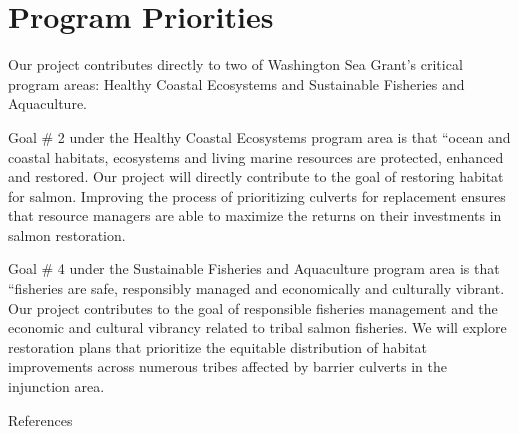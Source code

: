 \documentclass[12pt]{elsarticle}
\begin{document}
\section{Program Priorities} %

Our project contributes directly to two of Washington Sea Grant's critical program areas: Healthy Coastal Ecosystems and Sustainable Fisheries and Aquaculture. 

Goal \# 2 under the Healthy Coastal Ecosystems program area is that ``ocean and coastal habitats, ecosystems and living marine resources are protected, enhanced and restored. Our project will directly contribute to the goal of restoring habitat for salmon. Improving the process of prioritizing culverts for replacement ensures that resource managers are able to maximize the returns on their investments in salmon restoration.

Goal \# 4 under the Sustainable Fisheries and Aquaculture program area is that ``fisheries are safe, responsibly managed and economically and culturally vibrant. Our project contributes to the goal of responsible fisheries management and the economic and cultural vibrancy related to tribal salmon fisheries. We will explore restoration plans that prioritize the equitable distribution of habitat improvements across numerous tribes affected by barrier culverts in the injunction area. 





\clearpage
\large References\\
\normalsize

\end{document}
